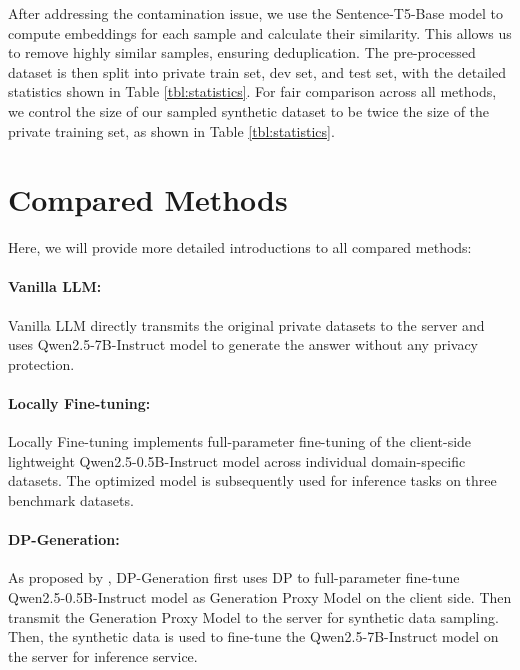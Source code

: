 After addressing the contamination issue, we use the Sentence-T5-Base model \cite{ni2022sen} to compute embeddings for each sample and calculate their similarity. 
This allows us to remove highly similar samples, ensuring deduplication. 
The pre-processed dataset is then split into private train set, dev set, and test set, with the detailed statistics shown in Table \ref{tbl:statistics}. For fair comparison across all methods, we control the size of our sampled synthetic dataset to be twice the size of the private training set, as shown in Table \ref{tbl:statistics}.


\section{Compared Methods}
\label{app:compare}
Here, we will provide more detailed introductions to all compared methods:




\paragraph{Vanilla LLM:} Vanilla LLM directly transmits the original private datasets to the server and uses Qwen2.5-7B-Instruct model \citep{yang2024qwen2} to generate the answer without any privacy protection.

\paragraph{Locally Fine-tuning:} Locally Fine-tuning implements full-parameter fine-tuning \citep{DingFullparameter23} of the client-side lightweight Qwen2.5-0.5B-Instruct model \citep{yang2024qwen2} across individual domain-specific datasets. The optimized model is subsequently used for inference tasks on three benchmark datasets.

\paragraph{DP-Generation:} As proposed by \citet{Kurakin2023HarnessingLM}, DP-Generation first uses DP to full-parameter fine-tune Qwen2.5-0.5B-Instruct model as Generation Proxy Model on the client side.
Then transmit the Generation Proxy Model to the server for synthetic data sampling. 
Then, the synthetic data is used to fine-tune the Qwen2.5-7B-Instruct model on the server for inference service.

